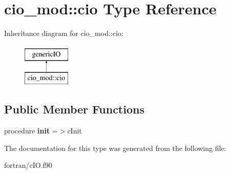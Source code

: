 \hypertarget{structcio__mod_1_1cio}{}\section{cio\+\_\+mod\+:\+:cio Type Reference}
\label{structcio__mod_1_1cio}
Inheritance diagram for cio\+\_\+mod\+:\+:cio\+:\begin{figure}[H]
\begin{center}
\leavevmode
\includegraphics[height=2.000000cm]{structcio__mod_1_1cio}
\end{center}
\end{figure}
\subsection*{Public Member Functions}
\begin{DoxyCompactItemize}
\item 
\mbox{\label{structcio__mod_1_1cio_a236082770e14a36a25a2f2aab49b37af}} 
procedure {\bfseries init} =$>$c\+Init
\end{DoxyCompactItemize}


The documentation for this type was generated from the following file\+:\begin{DoxyCompactItemize}
\item 
fortran/c\+I\+O.\+f90\end{DoxyCompactItemize}
